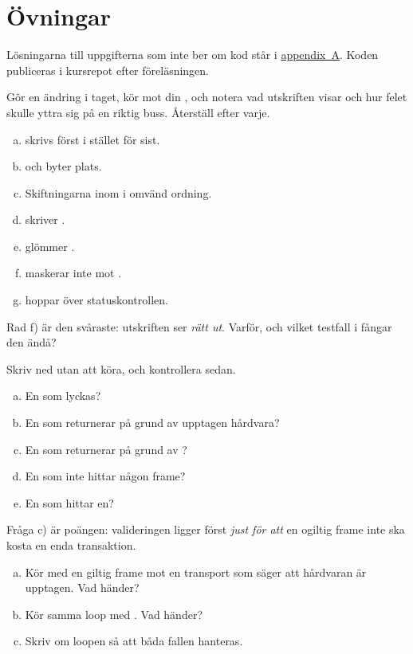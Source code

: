 \section*{Övningar}

Lösningarna till uppgifterna som inte ber om kod står i \hyperref[ch:losningar]{appendix~A}.
Koden publiceras i kursrepot efter föreläsningen.

\label{ex:10:1}
Gör en ändring i taget, kör mot din , och notera vad utskriften visar och hur
felet skulle yttra sig på en riktig buss. Återställ efter varje.
\begin{enumerate}[a)]
  \item {} skrivs först i stället för sist.
  \item {} och  byter plats.
  \item Skiftningarna inom  i omvänd ordning.
  \item {} skriver .
  \item {} glömmer .
  \item {} maskerar inte mot .
  \item {} hoppar över statuskontrollen.
\end{enumerate}
Rad f) är den svåraste: utskriften ser \emph{rätt ut}. Varför, och vilket testfall i
 fångar den ändå?

\label{ex:10:2}
Skriv ned utan att köra, och kontrollera sedan.
\begin{enumerate}[a)]
  \item En  som lyckas?
  \item En  som returnerar  på grund av upptagen hårdvara?
  \item En  som returnerar  på grund av ?
  \item En  som inte hittar någon frame?
  \item En  som hittar en?
\end{enumerate}
Fråga c) är poängen: valideringen ligger först \emph{just för att} en ogiltig frame inte ska kosta
en enda transaktion.

\label{ex:10:3}
\begin{enumerate}[a)]
  \item Kör  med en giltig frame mot en transport som säger
    att hårdvaran är upptagen. Vad händer?
  \item Kör samma loop med . Vad händer?
  \item Skriv om loopen så att båda fallen hanteras.
\end{enumerate}

